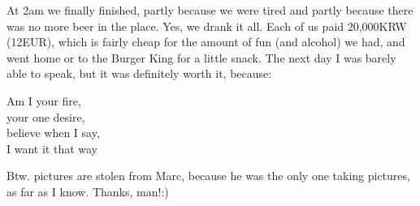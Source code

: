 \begin{post}
\begin{content}
At 2am we finally finished, partly because we were tired and partly because there was no more beer in the place. Yes, we drank it all. Each of us paid 20,000KRW (12EUR), which is fairly cheap for the amount of fun (and alcohol) we had, and went home or to the Burger King for a little snack. The next day I was barely able to speak, but it was definitely worth it, because:

\begin{blockquote}Am I your fire,\\
your one desire,\\
believe when I say,\\
I want it that way\end{blockquote}

Btw. pictures are stolen from Marc, because he was the only one taking pictures, as far as I know. Thanks, man!:)
	\end{content}
\end{post}
